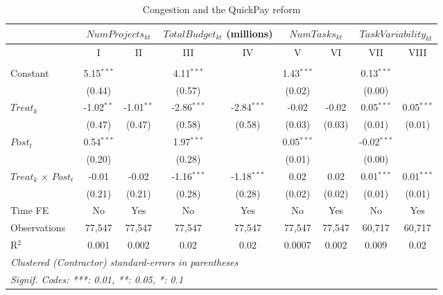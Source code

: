\documentclass[
]{article}
\begin{document}
\begin{table}[htbp]
   \caption{Congestion and the QuickPay reform}
   \centering
   \tiny
   \begin{tabular}{lcccccccc}
      \toprule
      \midrule  & \multicolumn{2}{c}{$NumProjects_{kt}$} & \multicolumn{2}{c}{$TotalBudget_{kt}$ (millions)} & \multicolumn{2}{c}{$NumTasks_{kt}$} & \multicolumn{2}{c}{$TaskVariability_{kt}$}\\
      \midrule  & I & II & III & IV & V & VI & VII & VIII\\
      \midrule \\
      Constant                     & 5.15$^{***}$ &              & 4.11$^{***}$  &               & 1.43$^{***}$ &        & 0.13$^{***}$  &   \\   
                                   & (0.44)       &              & (0.57)        &               & (0.02)       &        & (0.00)        &   \\   
      $Treat_k$                    & -1.02$^{**}$ & -1.01$^{**}$ & -2.86$^{***}$ & -2.84$^{***}$ & -0.02        & -0.02  & 0.05$^{***}$  & 0.05$^{***}$\\   
                                   & (0.47)       & (0.47)       & (0.58)        & (0.58)        & (0.03)       & (0.03) & (0.01)        & (0.01)\\   
      $Post_t$                     & 0.54$^{***}$ &              & 1.97$^{***}$  &               & 0.05$^{***}$ &        & -0.02$^{***}$ &   \\   
                                   & (0.20)       &              & (0.28)        &               & (0.01)       &        & (0.00)        &   \\   
      $Treat_k$ $\times$ $Post_t$  & -0.01        & -0.02        & -1.16$^{***}$ & -1.18$^{***}$ & 0.02         & 0.02   & 0.01$^{***}$  & 0.01$^{***}$\\   
                                   & (0.21)       & (0.21)       & (0.28)        & (0.28)        & (0.02)       & (0.02) & (0.01)        & (0.01)\\   
      \midrule 
      Time FE                      & No           & Yes          & No            & Yes           & No           & Yes    & No            & Yes\\  
      Observations                 & 77,547       & 77,547       & 77,547        & 77,547        & 77,547       & 77,547 & 60,717        & 60,717\\  
      R$^2$                        & 0.001        & 0.002        & 0.02          & 0.02          & 0.0007       & 0.002  & 0.009         & 0.02\\  
      \midrule
      \multicolumn{9}{l}{\emph{Clustered (Contractor) standard-errors in parentheses}}\\
      \multicolumn{9}{l}{\emph{Signif. Codes: ***: 0.01, **: 0.05, *: 0.1}}\\
   \end{tabular}
   

\end{table}
\end{document}
